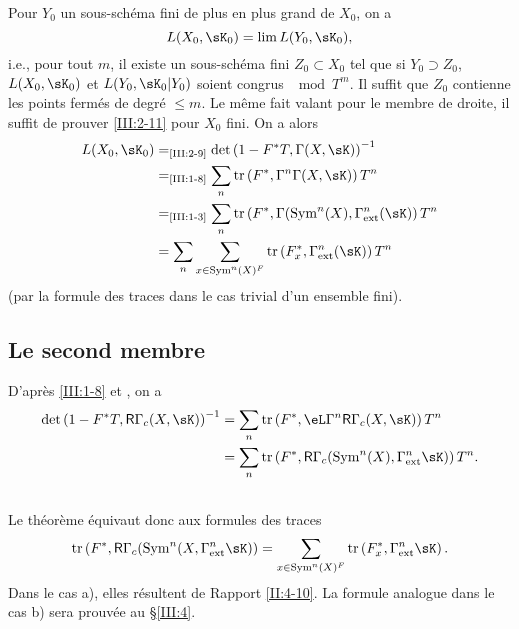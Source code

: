 Pour $Y_0$ un sous-schéma fini de plus en plus grand de $X_0$, on a 
\[
  L(X_0,\sK_0) = \lim L(Y_0,\sK_0) \text{,}
\]
i.e., pour tout $m$, il existe un sous-schéma fini $Z_0\subset X_0$ tel que 
si $Y_0\supset Z_0$, $L(X_0,\sK_0)$ et $L(Y_0,\sK_0|Y_0)$ soient congrus 
$\mod T^m$. 
Il suffit que $Z_0$ contienne les points fermés de degré $\leqslant m$. 
Le même fait valant pour le membre de droite, il suffit de prouver 
\ref{III:2-11} pour $X_0$ fini. On a alors 
\begin{align*}
  L(X_0,\sK_0) 
    &=_\text{\ref{III:2-9}} \det\left(1-F^* T,\Gamma(X,\sK)\right)^{-1} \\
    &=_\text{\ref{III:1-8}} \sum_n \tr\left(F^*,\Gamma^n \Gamma(X,\sK)\right) T^n \\
    &=_\text{\ref{III:1-3}} \sum_n \tr\left(F^*,\Gamma(\operatorname{Sym}^n(X),\Gamma_\text{ext}^n(\sK)\right) T^n \\
    &= \sum_n \sum_{x\in \operatorname{Sym}^n(X)^F} \tr\left(F_x^*,\Gamma_\text{ext}^n(\sK)\right) T^n
\end{align*}
(par la formule des traces dans le cas trivial d'un ensemble fini). 





\subsection{Le second membre}\label{III:2-12}

D'après \ref{III:1-8} et \cite[XVII 5.5.12]{sga4}, on a 
\begin{align*}
  \det\left(1-F^* T,\R\Gamma_c(X,\sK)\right)^{-1} 
    &= \sum_n \tr\left(F^*,\eL\Gamma^n\R\Gamma_c(X,\sK)\right) T^n \\
    &= \sum_n \tr\left(F^*,\R\Gamma_c(\operatorname{Sym}^n(X),\Gamma_\text{ext}^n\sK)\right) T^n \text{.}
\end{align*}





\subsection{}\label{III:2-13}

Le théorème équivaut donc aux formules des traces 
\[
  \tr\left(F^*,\R\Gamma_c(\operatorname{Sym}^n(X,\Gamma_\text{ext}^n \sK)\right) = \sum_{x\in\operatorname{Sym}^n(X)^F} \tr\left(F_x^*,\Gamma_\text{ext}^n\sK\right) \text{.}
\]
Dans le cas a), elles résultent de Rapport \ref{II:4-10}. La formule 
analogue dans le cas b) sera prouvée au \S\ref{III:4}. 










